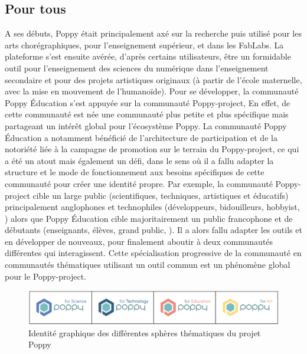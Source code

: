     \subsection{Pour tous}
        A ses débuts, Poppy était principalement axé sur la recherche puis utilisé pour les arts chorégraphiques, pour l’enseignement supérieur, et dans les FabLabs. La plateforme s’est ensuite avérée, d'après certains utilisateurs, être un formidable outil pour l’enseignement des sciences du numérique dans l’enseignement secondaire et pour des projets artistiques originaux (à partir de l’école maternelle, avec la mise en mouvement de l’humanoïde).
        Pour se développer, la communauté Poppy Éducation s'est appuyée sur la communauté Poppy-project, %
        En effet, de cette communauté est née une communauté plus petite et plus spécifique mais partageant un intérêt global pour l'écosystème Poppy. La communauté Poppy Éducation a notamment bénéficié de l'architecture de participation et de la notoriété liée à la campagne de promotion sur le terrain du Poppy-project, ce qui a été un atout mais également un défi, dans le sens où il a fallu adapter la structure et le mode de fonctionnement aux besoins spécifiques de cette communauté pour créer une identité propre. Par exemple, la communauté Poppy-project cible un large public (scientifiques, techniques, artistiques et éducatifs) principalement anglophones et technophiles (développeurs, bidouilleurs, hobbyist, \etc) alors que Poppy Éducation cible majoritairement un public francophone et de débutants (enseignants, élèves, grand public, \etc). Il a alors fallu adapter les outils et en développer de nouveaux, pour finalement aboutir à deux communautés différentes qui interagissent. Cette spécialisation progressive de la communauté en communautés thématiques utilisant un outil commun est un phénomène global pour le Poppy-project.
        \begin{figure}[!h]
            \centering
            \includegraphics[width=\linewidth]{Figures/Poppy-BlocMarques}
            \caption[Identité graphique Poppy-project]{Identité graphique des différentes sphères thématiques du projet Poppy}
            \label{fig:blocmarque}
        \end{figure}\par%
